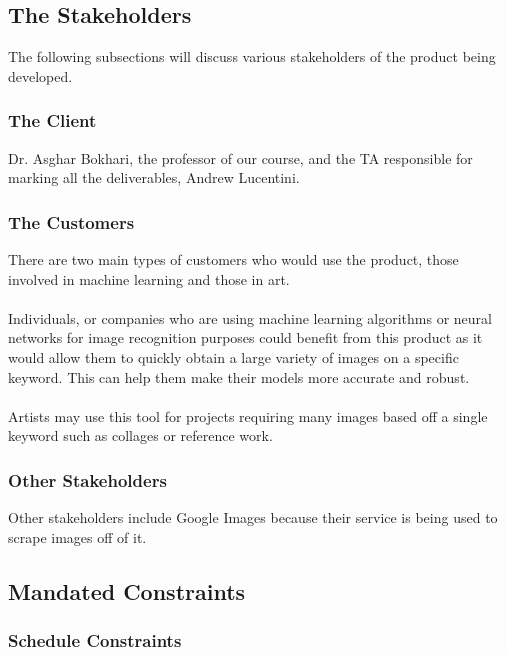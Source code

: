 \documentclass[12pt, titlepage]{article}
\begin{document}
\subsection{The Stakeholders}

The following subsections will discuss various stakeholders of the product being developed.

\subsubsection{The Client}

Dr. Asghar Bokhari, the professor of our course, and the TA responsible for marking all the deliverables, Andrew Lucentini.

\subsubsection{The Customers}

There are two main types of customers who would use the product, those involved in machine learning and those in art.
\\ \\
Individuals, or companies who are using machine learning algorithms or neural networks for image recognition purposes could benefit from this product as it would allow them to quickly obtain a large variety of images on a specific keyword. This can help them make their models more accurate and robust.
\\ \\
Artists may use this tool for projects requiring many images based off a single keyword such as collages or reference work.

\subsubsection{Other Stakeholders}

Other stakeholders include Google Images because their service is being used to scrape images off of it.

\subsection{Mandated Constraints}

\subsubsection{Schedule Constraints}
\end{document}
